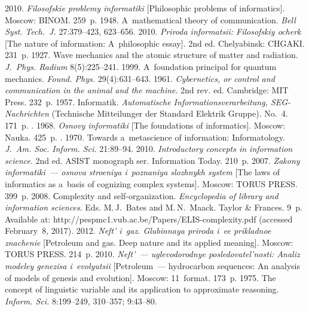 \begin{multicols}{2}
{{\begin{thebibliography}{99}
 2010. \textit{Filosofskie problemy informatiki} 
[Philosophic problems of informatics]. Moscow: BINOM. 259~p.
 1948. A~mathematical theory of communication. 
\textit{Bell Syst. Tech.~J.} 27:379--423, 623--656.
 2010. \textit{Priroda informatsii: Filosofskiy ocherk} 
[The nature of information: A~philosophic essay]. 2nd ed. Chelyabinsk: 
CHGAKI. 231~p.
 1927. Wave mechanics and the atomic structure of 
matter and radiation. \textit{J.~Phys. Radium} 8(5):225--241.
 1999. A~foundation principal for quantum mechanics. 
\textit{Found. Phys.} 29(4):631--643.
 1961. \textit{Cybernetics, or control and communication 
in the animal and the machine}. 2nd rev. ed. Cambridge: MIT Press. 
232~p.
 1957. Informatik. \textit{Automatische 
Informationsverarbeitung, SEG-Nachrichten} (Technische Mitteilunger der 
Standard Elektrik Gruppe). No.~4. 171~p.
. 1968. 
\textit{Osnovy informatiki} [The foundations of informatics]. Moscow: 
Nauka. 425~p.
. 1970. Towards a~metascience of 
information: Informatology. \textit{J.~Am. Soc. Inform. 
Sci.} 21:89--94.
 2010. \textit{Introductory concepts in information 
science}. 2nd ed. ASIST monograph ser. Information Today. 210~p.
 2007. \textit{Zakony informatiki~--- osnova 
stroeniya i~poznaniya slozhnykh system} [The laws of informatics as a~basis 
of cognizing complex systems]. Moscow: TORUS PRESS. 399~p.
 2008. Сomplexity and self-organization. 
\textit{Encyclopedia of library and information sciences}. Eds. M.\,J.~Bates 
and M.\,N.~Maack. Taylor \& Frances. 9~p. Available at: {\sf 
http://pespmc1.vub.ac.be/Papers/ELIS-complexity.pdf} (accessed 
February~8, 2017).
 2012. \textit{Neft' i~gaz. Glubinnaya priroda 
i~ee prikladnoe znachenie} [Petroleum and gas. Deep nature and its applied 
meaning].  Moscow: TORUS PRESS. 214~p. 
 2010. \textit{Neft'~--- uglevodorodnye 
posledovatel'nosti: Analiz modeley genezisa i~evolyutsii} [Petroleum~--- 
hydrocarbon sequences: An analysis of models of genesis and evolution]. 
Moscow: 11~format. 173~p.
 1975. The concept of linguistic variable and its 
application to approximate reasoning. \textit{Inform. Sci.} 8:199--249,  
310--357; 9:43--80.
\end{thebibliography} }
 }

\end{multicols}

